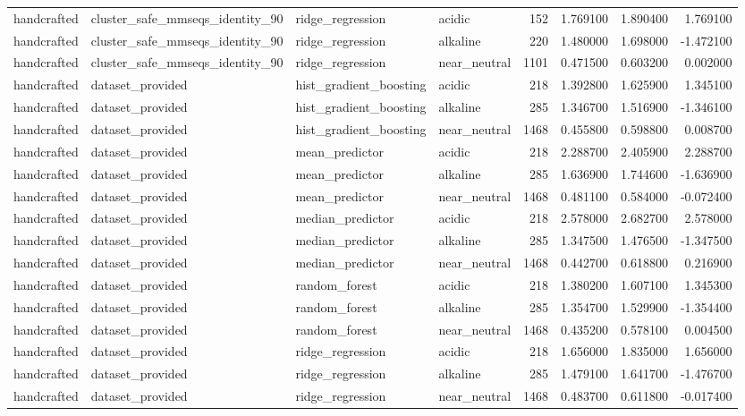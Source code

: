 \begin{longtable}{llllrrrr}
handcrafted & cluster\_safe\_mmseqs\_identity\_90 & ridge\_regression & acidic & 152 & 1.769100 & 1.890400 & 1.769100 \\
handcrafted & cluster\_safe\_mmseqs\_identity\_90 & ridge\_regression & alkaline & 220 & 1.480000 & 1.698000 & -1.472100 \\
handcrafted & cluster\_safe\_mmseqs\_identity\_90 & ridge\_regression & near\_neutral & 1101 & 0.471500 & 0.603200 & 0.002000 \\
handcrafted & dataset\_provided & hist\_gradient\_boosting & acidic & 218 & 1.392800 & 1.625900 & 1.345100 \\
handcrafted & dataset\_provided & hist\_gradient\_boosting & alkaline & 285 & 1.346700 & 1.516900 & -1.346100 \\
handcrafted & dataset\_provided & hist\_gradient\_boosting & near\_neutral & 1468 & 0.455800 & 0.598800 & 0.008700 \\
handcrafted & dataset\_provided & mean\_predictor & acidic & 218 & 2.288700 & 2.405900 & 2.288700 \\
handcrafted & dataset\_provided & mean\_predictor & alkaline & 285 & 1.636900 & 1.744600 & -1.636900 \\
handcrafted & dataset\_provided & mean\_predictor & near\_neutral & 1468 & 0.481100 & 0.584000 & -0.072400 \\
handcrafted & dataset\_provided & median\_predictor & acidic & 218 & 2.578000 & 2.682700 & 2.578000 \\
handcrafted & dataset\_provided & median\_predictor & alkaline & 285 & 1.347500 & 1.476500 & -1.347500 \\
handcrafted & dataset\_provided & median\_predictor & near\_neutral & 1468 & 0.442700 & 0.618800 & 0.216900 \\
handcrafted & dataset\_provided & random\_forest & acidic & 218 & 1.380200 & 1.607100 & 1.345300 \\
handcrafted & dataset\_provided & random\_forest & alkaline & 285 & 1.354700 & 1.529900 & -1.354400 \\
handcrafted & dataset\_provided & random\_forest & near\_neutral & 1468 & 0.435200 & 0.578100 & 0.004500 \\
handcrafted & dataset\_provided & ridge\_regression & acidic & 218 & 1.656000 & 1.835000 & 1.656000 \\
handcrafted & dataset\_provided & ridge\_regression & alkaline & 285 & 1.479100 & 1.641700 & -1.476700 \\
handcrafted & dataset\_provided & ridge\_regression & near\_neutral & 1468 & 0.483700 & 0.611800 & -0.017400 \\

\end{longtable}

